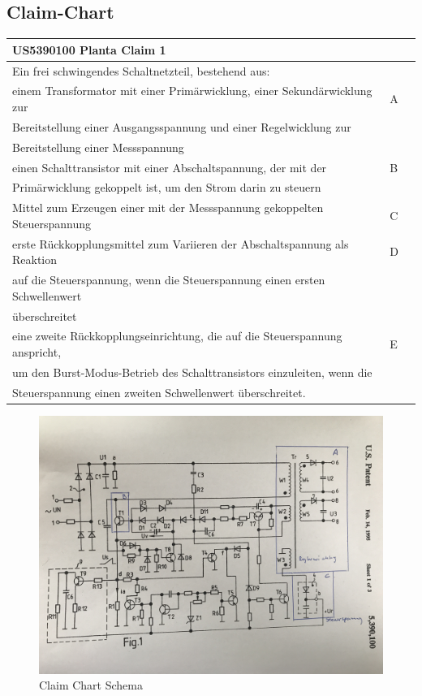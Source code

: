 \subsection{Claim-Chart}\label{sec:Claim-Chart}
\begin{tabular}{|l|l|l|}
	\hline 
\textbf{US5390100 Planta Claim 1}& &    \\ 
	\hline 
Ein frei schwingendes Schaltnetzteil, bestehend aus:	&  &  \\ 
	\hline 
einem Transformator mit einer Primärwicklung, einer Sekundärwicklung zur& A &  \\ Bereitstellung einer Ausgangsspannung und einer Regelwicklung zur&  &  \\
Bereitstellung einer Messspannung & &	 \\
	\hline 
einen Schalttransistor mit einer Abschaltspannung, der mit der & B & \\
Primärwicklung gekoppelt ist, um den Strom darin zu steuern	&  &  \\ 
	\hline 
Mittel zum Erzeugen einer mit der Messspannung gekoppelten Steuerspannung	& C &  \\ 
	\hline 
erste Rückkopplungsmittel zum Variieren der Abschaltspannung als Reaktion & D &\\
auf die Steuerspannung, wenn die Steuerspannung einen ersten Schwellenwert & &\\
überschreitet	&  &  \\ 
	\hline 
eine zweite Rückkopplungseinrichtung, die auf die Steuerspannung anspricht, & E &\\
um den Burst-Modus-Betrieb des Schalttransistors einzuleiten, wenn die & &\\
Steuerspannung einen zweiten Schwellenwert überschreitet.	&  &  \\ 
	\hline 

\end{tabular} 

\begin{figure}[h!]
	\centering
	\includegraphics[width=1\textwidth]{graphics/CCHSchema}
	\caption{Claim Chart Schema}
	\label{fig:CCHSchema}
\end{figure} 